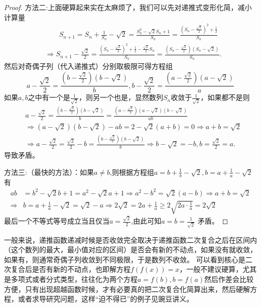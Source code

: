 \documentclass[../../main.tex]{subfiles}%
\begin{document}
\begin{proof}
{\color{blue}方法二:}上面硬算起来实在太麻烦了，我们可以先对递推式变形化简，减小计算量
\begin{align*}
&\qquad S_{n+1}=S_n+\frac{1}{S_n}-\sqrt{2}=\frac{S_{n}^{2}-\sqrt{2}S_n+1}{S_n}=\frac{\left( S_n-\frac{\sqrt{2}}{2} \right) ^2+\frac{1}{2}}{S_n}
\\
&\Longrightarrow S_{n+1}-\frac{\sqrt{2}}{2}=\frac{\left( S_n-\frac{\sqrt{2}}{2} \right) ^2+\frac{1}{2}-\frac{\sqrt{2}}{2}S_n}{S_n}=\frac{\left( S_n-\frac{\sqrt{2}}{2} \right) (S_n-\sqrt{2})}{S_n}.
\end{align*}
然后对奇偶子列（代入递推式）分别取极限可得方程组
\[a-\frac{\sqrt{2}}{2}=\frac{\left(b-\frac{\sqrt{2}}{2}\right)(b - \sqrt{2})}{b},b-\frac{\sqrt{2}}{2}=\frac{\left(a-\frac{\sqrt{2}}{2}\right)(a - \sqrt{2})}{a}\]
如果\(a,b\)之中有一个是\(\frac{1}{\sqrt{2}}\)，则另一个也是，显然数列\(S_n\)收敛于\(\frac{1}{\sqrt{2}}\)，如果都不是则
\begin{align*}
&a-\frac{\sqrt{2}}{2}=\frac{\left( b-\frac{\sqrt{2}}{2} \right) (b-\sqrt{2})}{b}=\frac{\left( a-\frac{\sqrt{2}}{2} \right) (a-\sqrt{2})(b-\sqrt{2})}{ab}
\\
&\Rightarrow \left( a-\sqrt{2} \right) \left( b-\sqrt{2} \right) -ab=2-\sqrt{2}(a+b)=0\Rightarrow a+b=\sqrt{2}
\\
&\Rightarrow a-\frac{\sqrt{2}}{2}=\frac{\sqrt{2}}{2}-b=\frac{\left( b-\frac{\sqrt{2}}{2} \right) (b-\sqrt{2})}{b}\Rightarrow b-\sqrt{2}=-b,b=\frac{\sqrt{2}}{2}=a.
\end{align*}
导致矛盾。

{\color{blue}方法三:}（最快的方法）：如果\(a\neq b\),则根据方程组\(a = b+\frac{1}{b}-\sqrt{2},b = a+\frac{1}{a}-\sqrt{2}\)有
\begin{align*}
ab&=b^2-\sqrt{2}b+1=a^2-\sqrt{2}a+1\Rightarrow a^2-b^2=\sqrt{2}\left( a-b \right) \Rightarrow a+b=\sqrt{2}\\
\Rightarrow &b=a+\frac{1}{a}-\sqrt{2}=\sqrt{2}-a\Rightarrow 2\sqrt{2}=2a+\frac{1}{a}\geqslant 2\sqrt{2a\cdot\frac{1}{a}}=2\sqrt{2}
\end{align*}
最后一个不等式等号成立当且仅当$a=\frac{\sqrt{2}}{2}$,由此可知\(a = b=\frac{1}{\sqrt{2}}\) 矛盾。
\end{proof}
\begin{remark}
一般来说，递推函数递减时候是否收敛完全取决于递推函数二次复合之后在区间内（这个数列的最大，最小值对应的区间）是否会有新的不动点，如果没有就收敛，如果有，则通常奇偶子列收敛到不同极限，于是数列不收敛。
可以看到核心是二次复合后是否有新的不动点，也即解方程\(f(f(x)) = x\)，一般不建议硬算，尤其是多项式或者分式类型，往往化为两个方程\(a = f(b),b = f(a)\)然后作差会比较方便，只有出现超越函数时候，才有必要真的把二次复合化简算出来，然后硬解方程，或者求导研究问题，这样“迫不得已”的例子见豌豆讲义。
\end{remark}
\end{document}
